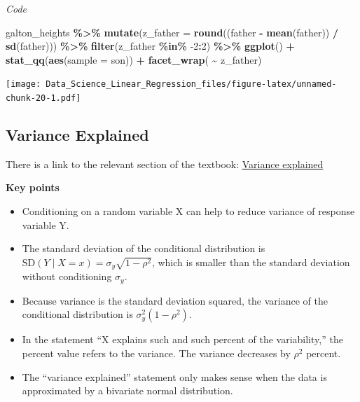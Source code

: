 \documentclass[
]{article}
\newenvironment{Shaded}{\begin{snugshade}}{\end{snugshade}}
\newcommand{\DataTypeTok}[1]{\textcolor[rgb]{0.13,0.29,0.53}{#1}}
\newcommand{\DecValTok}[1]{\textcolor[rgb]{0.00,0.00,0.81}{#1}}
\newcommand{\KeywordTok}[1]{\textcolor[rgb]{0.13,0.29,0.53}{\textbf{#1}}}
\newcommand{\NormalTok}[1]{#1}
\newcommand{\OperatorTok}[1]{\textcolor[rgb]{0.81,0.36,0.00}{\textbf{#1}}}
\newcommand{\StringTok}[1]{\textcolor[rgb]{0.31,0.60,0.02}{#1}}
\providecommand{\tightlist}{%
  \setlength{\itemsep}{0pt}\setlength{\parskip}{0pt}}
\begin{document}
\emph{Code}

\begin{Shaded}
\begin{Highlighting}[]
\NormalTok{galton\_heights }\OperatorTok{\%\textgreater{}\%}
\StringTok{  }\KeywordTok{mutate}\NormalTok{(}\DataTypeTok{z\_father =} \KeywordTok{round}\NormalTok{((father }\OperatorTok{{-}}\StringTok{ }\KeywordTok{mean}\NormalTok{(father)) }\OperatorTok{/}\StringTok{ }\KeywordTok{sd}\NormalTok{(father))) }\OperatorTok{\%\textgreater{}\%}
\StringTok{  }\KeywordTok{filter}\NormalTok{(z\_father }\OperatorTok{\%in\%}\StringTok{ }\DecValTok{{-}2}\OperatorTok{:}\DecValTok{2}\NormalTok{) }\OperatorTok{\%\textgreater{}\%}
\StringTok{  }\KeywordTok{ggplot}\NormalTok{() }\OperatorTok{+}\StringTok{  }
\StringTok{  }\KeywordTok{stat\_qq}\NormalTok{(}\KeywordTok{aes}\NormalTok{(}\DataTypeTok{sample =}\NormalTok{ son)) }\OperatorTok{+}
\StringTok{  }\KeywordTok{facet\_wrap}\NormalTok{( }\OperatorTok{\textasciitilde{}}\StringTok{ }\NormalTok{z\_father)}
\end{Highlighting}
\end{Shaded}

\texttt{[image: Data\_Science\_Linear\_Regression\_files/figure-latex/unnamed-chunk-20-1.pdf]}

\hypertarget{variance-explained}{%
\subsection{Variance Explained}\label{variance-explained}}

There is a link to the relevant section of the textbook:
\href{https://rafalab.github.io/dsbook/regression.html\#variance-explained}{Variance
explained}

\textbf{Key points}

\begin{itemize}
\tightlist
\item
  Conditioning on a random variable X can help to reduce variance of
  response variable Y.
\item
  The standard deviation of the conditional distribution is
  \(\mbox{SD}(Y \mid X=x) = \sigma_y\sqrt{1-\rho^2}\), which is smaller
  than the standard deviation without conditioning \(\sigma_y\).
\item
  Because variance is the standard deviation squared, the variance of
  the conditional distribution is \(\sigma_y^2(1-\rho^2)\).
\item
  In the statement ``X explains such and such percent of the
  variability,'' the percent value refers to the variance. The variance
  decreases by \(\rho^2\) percent.
\item
  The ``variance explained'' statement only makes sense when the data is
  approximated by a bivariate normal distribution.
\end{itemize}
\end{document}
